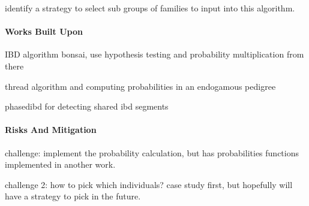 \documentclass[12pt]{article}
\begin{document}
identify a strategy to select sub groups of families to input into this algorithm.

\paragraph*{Works Built Upon}

IBD algorithm bonsai, use hypothesis testing and probability multiplication from there

thread algorithm and computing probabilities in an endogamous pedigree

phasedibd for detecting shared ibd segments

\paragraph*{Risks And Mitigation}

challenge: implement the probability calculation, but has probabilities functions implemented in another work.

challenge 2: how to pick which individuals? case study first, but hopefully will have a strategy to pick in the future. 

\printbibliography
\end{document}
